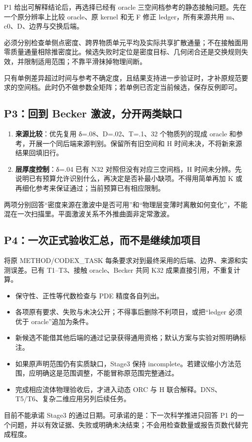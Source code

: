 \documentclass[
  10pt,
  a4paper,
]{article}
\providecommand{\tightlist}{%
  \setlength{\itemsep}{0pt}\setlength{\parskip}{0pt}}
\begin{document}
P1 给出可解释结论后，再选择已经有 oracle
三空间档参考的静态接触问题。先在一个原分辨率上比较 oracle、原 kernel
和无 F 修正 ledger，所有来源共用 m、c0、D、边界与交换后端。

必须分别检查单侧点密度、跨界物质单元平均及实际共享扩散通量；不在接触面用零质量通量相除推密度比。候选失败时定位是密度目标、几何闭合还是交换规则失效，并限制适用范围；不靠平滑抹掉物理间断。

只有单例差异超过时间与参考不确定度，且结果支持进一步验证时，才补原规范要求的空间档。此时仍不做参数全矩阵；若单例已否定当前候选，保存反例即可。

\subsection{P3：回到 Becker
激波，分开两类缺口}\label{p3ux56deux5230-becker-ux6fc0ux6ce2ux5206ux5f00ux4e24ux7c7bux7f3aux53e3}

\begin{enumerate}
\def\labelenumi{\arabic{enumi}.}
\tightlist
\item
  \textbf{来源比较}：优先复用 δ=.08、D=.02、T=.1、32 个物质列的现成
  oracle 和参考，开展一个同后端来源判别。保留所有旧空间和 H
  时间未决，不将新来源结果回填旧行。
\item
  \textbf{层厚度控制}：δ=.04 已有 N32 对照但没有对应三空间档，H
  时间未分辨。先说明已有预算允许识别什么，再决定是否补最小缺项。不得用简单再加
  K 或再细化参考来保证通过；当前预算已有相应限制。
\end{enumerate}

两项分别回答``密度来源在激波中是否可用''和``物理层变薄时离散如何变化''，不能混在一次扫描里。平面激波关系不外推曲面非定常激波。

\subsection{P4：一次正式验收汇总，而不是继续加项目}\label{p4ux4e00ux6b21ux6b63ux5f0fux9a8cux6536ux6c47ux603bux800cux4e0dux662fux7ee7ux7eedux52a0ux9879ux76ee}

将原 METHOD/CODEX\_TASK
每条要求对到最终采用的后端、边界、来源和实测误差。已有 T1--T3、接触
oracle、Becker 共同 K32 成果直接引用，不重复计算。

\begin{itemize}
\tightlist
\item
  保守性、正性等代数检查与 PDE 精度各自列出。
\item
  各项原有要求、失败与未决公开；不得事后删除不利项目，或把``ledger
  必须优于 oracle''追加为条件。
\item
  新候选不能借其他后端的通过记录获得通用资格；默认方案与实验对照明确标注。
\item
  如果原声明范围仍有实质缺口，Stage3 保持
  incomplete。若建议缩小方法范围，应明确这是范围调整，不能冒称原范围完整通过。
\item
  完成相应流体物理验收后，才进入动态 ORC 与 H
  联合解释。DNS、T5/T6、复杂二维应用另列后续任务。
\end{itemize}

目前不能承诺 Stage3 的通过日期。可承诺的是：下一次科学推进只回答 P1
的一个问题，并以有效证据、失败或明确未决结束；不会用检查数量或报告页数代替完成程度。
\end{document}
